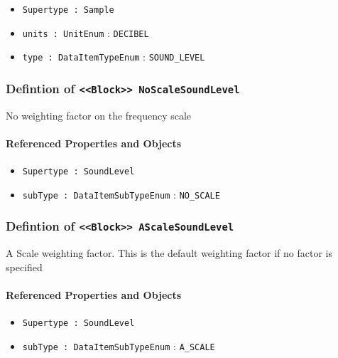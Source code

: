 \begin{itemize}
\item \texttt{Supertype : Sample}

\item \texttt{units : UnitEnum} : \texttt{DECIBEL}

\item \texttt{type : DataItemTypeEnum} : \texttt{SOUND_LEVEL}

\end{itemize}
\FloatBarrier
\subsubsection{Defintion of \texttt{<<Block>> NoScaleSoundLevel}}
  \label{type:NoScaleSoundLevel}

\FloatBarrier

No weighting factor on the frequency scale

\FloatBarrier
\paragraph{Referenced Properties and Objects}

\begin{itemize}
\item \texttt{Supertype : SoundLevel}

\item \texttt{subType : DataItemSubTypeEnum} : \texttt{NO_SCALE}

\end{itemize}
\FloatBarrier
\subsubsection{Defintion of \texttt{<<Block>> AScaleSoundLevel}}
  \label{type:AScaleSoundLevel}

\FloatBarrier

A Scale weighting factor.   This is the default weighting factor if no factor is specified

\FloatBarrier
\paragraph{Referenced Properties and Objects}

\begin{itemize}
\item \texttt{Supertype : SoundLevel}

\item \texttt{subType : DataItemSubTypeEnum} : \texttt{A_SCALE}

\end{itemize}
\FloatBarrier
